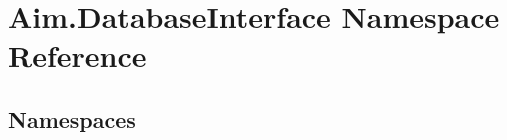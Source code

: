 \hypertarget{namespace_aim_1_1_database_interface}{}\section{Aim.\+Database\+Interface Namespace Reference}
\label{namespace_aim_1_1_database_interface}
\subsection*{Namespaces}
\begin{DoxyCompactItemize}
\end{DoxyCompactItemize}
